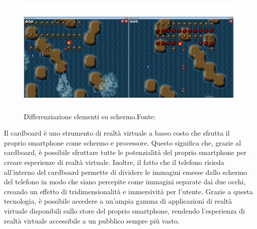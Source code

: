 \documentclass[
a4paper,
cleardoublepage=empty,
headings=twolinechapter,
numbers=autoenddot,
]{scrbook}
\begin{document}
	\begin{figure}[H]
		\centering
		\includegraphics[width=0.8\linewidth]{image/3D4Amb_2}
		\caption{Differenziazione elementi su schermo.Fonte:\cite{3d4amb}}
		\label{fig:cardboard-3D4Amb_elementi}
	\end{figure}
	Il cardboard è uno strumento di realtà virtuale a basso costo che sfrutta il proprio smartphone come schermo e processore. Questo significa che, grazie al cardboard, è possibile sfruttare tutte le potenzialità del proprio smartphone per creare esperienze di realtà virtuale. Inoltre, il fatto che il telefono risieda all'interno del cardboard permette di dividere le immagini emesse dallo schermo del telefono in modo che siano percepite come immagini separate dai due occhi, creando un effetto di tridimensionalità e immersività per l'utente. Grazie a questa tecnologia, è possibile accedere a un'ampia gamma di applicazioni di realtà virtuale disponibili sullo store del proprio smartphone, rendendo l'esperienza di realtà virtuale accessibile a un pubblico sempre più vasto.
\end{document}
